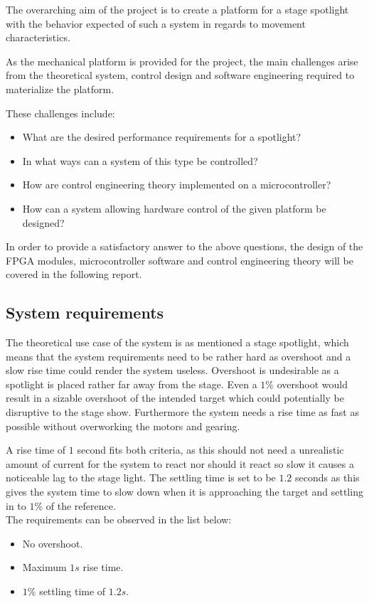 \documentclass[../../main]{subfiles}
\begin{document}
The overarching aim of the project is to create a platform for a stage spotlight with the behavior expected of such a system in regards to movement characteristics.

As the mechanical platform is provided for the project, the main challenges arise from the theoretical system, control design and software engineering required to materialize the platform.

These challenges include:

\begin{itemize}
    \item What are the desired performance requirements for a spotlight?
    \item In what ways can a system of this type be controlled?
    \item How are control engineering theory implemented on a microcontroller?
    \item How can a system allowing hardware control of the given platform be designed?
\end{itemize}

In order to provide a satisfactory answer to the above questions, the design of the FPGA modules, microcontroller software and control engineering theory will be covered in the following report.

\subsection{System requirements}
The theoretical use case of the system is as mentioned a stage spotlight, which means that the system requirements need to be rather hard as overshoot and a slow rise time could render the system useless.
Overshoot is undesirable as a spotlight is placed rather far away from the stage. Even a $1\%$ overshoot would result in a sizable overshoot of the intended target which could potentially be disruptive to the stage show.
Furthermore the system needs a rise time as fast as possible without overworking the motors and gearing.

A rise time of $1$ second fits both criteria, as this should not need a unrealistic amount of current for the system to react nor should it react so slow it causes a noticeable lag to the stage light.
The settling time is set to be $1.2$ seconds as this gives the system time to slow down when it is approaching the target and settling in to $1\%$ of the reference.
\\
The requirements can be observed in the list below:

\begin{itemize}
  \item No overshoot.
  \item Maximum $1s$ rise time.
  \item $1\%$ settling time of $1.2s$.
\end{itemize}
\end{document}
